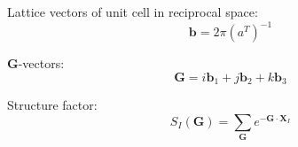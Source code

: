 \documentclass[a4paper,11pt]{extarticle}
\begin{document}
Lattice vectors of unit cell in reciprocal space:
\begin{equation}\label{eq:recvecs}
\mathbf{b} = 2\pi\left( a^{T} \right)^{-1}
\end{equation}

\textbf{G}-vectors:
\begin{equation}
\mathbf{G} = i \mathbf{b}_{1} + j \mathbf{b}_{2} + k \mathbf{b}_{3}
\end{equation}

Structure factor:
\begin{equation}
S_{I}(\mathbf{G}) = \sum_{\mathbf{G}} e^{ -\mathbf{G}\cdot\mathbf{X}_{I} }
\end{equation}
\end{document}
